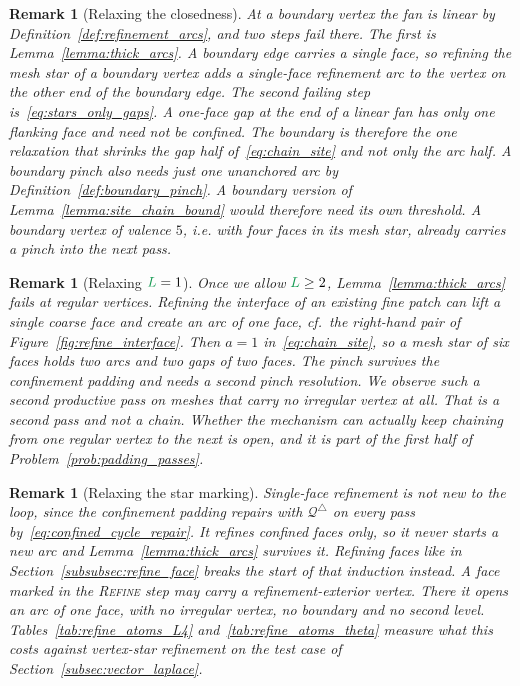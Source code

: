 \documentclass[a4paper, 12pt]{article}
\newcommand{\robert}[1]{{\color{orange} #1}}
\newcommand{\quadriF}{\mathcal{Q}^{\triangle}}                   %
\newcommand{\green}{\color{ForestGreen}}
\renewcommand{\L}{{\green L}}
\newtheorem{remark}[theorem]{Remark}
\theoremstyle{definition}
\theoremstyle{plain}
\numberwithin{equation}{section}
\newcommand{\tobecut}[1]{{\color{red} #1}}     %
\begin{document}
\begin{remark}[Relaxing the closedness]
    \label{rem:boundary_chain}
    At a boundary vertex the fan is linear by Definition~\ref{def:refinement_arcs}, and two steps fail there. The first is Lemma~\ref{lemma:thick_arcs}. A boundary edge carries a single face, so refining the mesh star of a boundary vertex adds a single-face refinement arc to the vertex on the other end of the boundary edge. The second failing step is~\eqref{eq:stars_only_gaps}. A one-face gap at the end of a linear fan has only one flanking face and need not be confined. The boundary is therefore the one relaxation that shrinks the gap half of~\eqref{eq:chain_site} and not only the arc half. A boundary pinch also needs just one unanchored arc by Definition~\ref{def:boundary_pinch}. A boundary version of Lemma~\ref{lemma:site_chain_bound} would therefore need its own threshold. A boundary vertex of valence $5$, i.e. with four faces in its mesh star, already carries a pinch into the next pass.
\end{remark}

\begin{remark}[Relaxing $\L = 1$]
    \label{rem:regular_chain}
    Once we allow $\L \geq 2$, Lemma~\ref{lemma:thick_arcs} fails at regular vertices. Refining the interface of an existing fine patch can lift a single coarse face and create an arc of one face, cf.\ the right-hand pair of Figure~\ref{fig:refine_interface}. Then $a = 1$ in~\eqref{eq:chain_site}, so a mesh star of six faces holds two arcs and two gaps of two faces. The pinch survives the confinement padding and needs a second pinch resolution. We observe such a second productive pass on meshes that carry no irregular vertex at all. That is a second pass and not a chain. Whether the mechanism can actually keep chaining from one regular vertex to the next is open, and it is part of \tobecut{the first half of} Problem~\ref{prob:padding_passes}.
\end{remark}

\begin{remark}[Relaxing the star marking]
    \label{rem:face_marking_chain}
    Single-face refinement is not new to the loop, since the confinement padding repairs with $\quadriF$ on every pass by~\eqref{eq:confined_cycle_repair}. It refines confined faces only, so it never starts a new arc and Lemma~\ref{lemma:thick_arcs} survives it. Refining faces like in Section~\ref{subsubsec:refine_face} breaks the start of that induction instead. A face marked in the \textsc{Refine} step may carry a refinement-exterior vertex. There it opens an arc of one face, with no irregular vertex, no boundary and no second level.
    \robert{Tables~\ref{tab:refine_atoms_L4} and~\ref{tab:refine_atoms_theta} measure what this costs against vertex-star refinement on the test case of Section~\ref{subsec:vector_laplace}.}
\end{remark}
\end{document}
